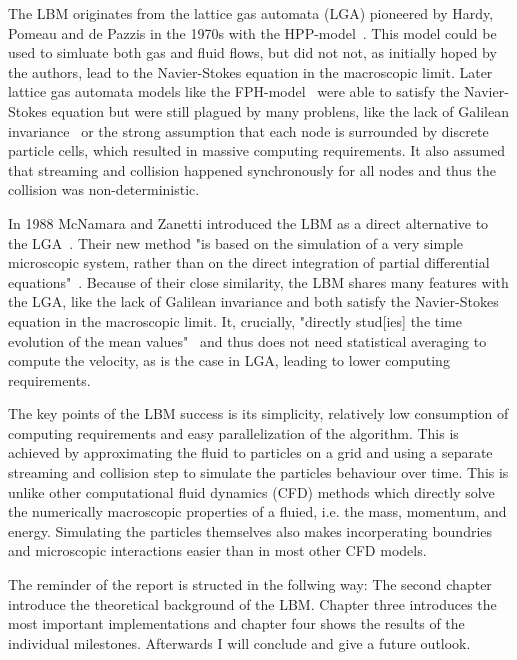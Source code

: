 \documentclass[a4paper,12pt, oneside]{book}
\begin{document}
The LBM originates from the lattice gas automata (LGA) pioneered by Hardy, Pomeau and de Pazzis in the 1970s with the HPP-model~\cite{hardy1973timeHPP}.
This model could be used to simluate both gas and fluid flows, but did not not, as initially hoped by the authors, lead to the Navier-Stokes equation in the macroscopic limit.
Later lattice gas automata models like the FPH-model~\cite{PhysRevLett.56.1505-fhp} were able to satisfy the Navier-Stokes equation but were still plagued by many problens, like the lack of Galilean invariance~\cite{nie2008galileanInvariance} or the strong assumption
that each node is surrounded by discrete particle cells, which resulted in massive computing requirements.
It also assumed that streaming and collision happened synchronously for all nodes and thus the collision was non-deterministic.

In 1988 McNamara and Zanetti introduced the LBM as a direct alternative to the LGA~\cite{mcnamara1988boltzmann-method}.
Their new method "is based on the simulation of a very simple microscopic system, rather than on the direct integration of partial differential equations"~\cite{mcnamara1988boltzmann-method}.
Because of their close similarity, the LBM shares many features with the LGA, like the lack of Galilean invariance and both satisfy the Navier-Stokes equation in the macroscopic limit.
It, crucially, "directly stud[ies] the time evolution of the mean values"~\cite{mcnamara1988boltzmann-method} and thus does not need statistical averaging to compute the velocity, as is the case in LGA, leading to lower computing requirements.

The key points of the LBM success is its simplicity, relatively low consumption of computing requirements and easy parallelization of the algorithm.
This is achieved by approximating the fluid to particles on a grid and using a separate streaming and collision step to simulate the particles behaviour over time.
This is unlike other computational fluid dynamics (CFD) methods which directly solve the numerically macroscopic properties of a fluied, i.e. the mass, momentum, and energy.
Simulating the particles themselves also makes incorperating boundries and microscopic interactions easier than in most other CFD models.

The reminder of the report is structed in the follwing way: The second chapter introduce the theoretical background of the LBM. Chapter three introduces the most important implementations and chapter four shows the results of the individual milestones.
Afterwards I will conclude and give a future outlook.
\end{document}
